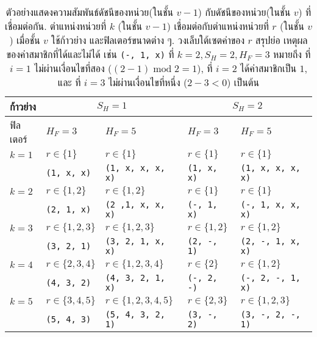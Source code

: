 %
\begin{table}[hbtp]
	\caption[ความสัมพันธ์ของดัชนีหน่วยคำนวณ]{ตัวอย่างแสดงความสัมพันธ์ดัชนีของหน่วย(ในชั้น $v-1$) กับดัชนีของหน่วย(ในชั้น $v$) ที่เชื่อมต่อกัน. 
		ตำแหน่งหน่วยที่ $k$ (ในชั้น $v-1$) เชื่อมต่อกับตำแหน่งหน่วยที่ $r$ (ในชั้น $v$) เมื่อชั้น $v$ ใช้ก้าวย่าง และฟิลเตอร์ขนาดต่าง ๆ.
		วงเล็บใต้เซตค่าของ $r$ สรุปย่อ เหตุผลของค่าสมาชิกที่ได้และไม่ได้ 
		เช่น \texttt{(-, 1, x)} ที่ $k = 2, S_H = 2, H_F = 3$ หมายถึง ที่ $i=1$ ไม่ผ่านเงื่อนไขที่สอง ($(2 - 1) \;\mathrm{mod}\; 2 = 1$), ที่ $i=2$ ได้ค่าสมาชิกเป็น $1$, และ ที่ $i=3$ ไม่ผ่านเงื่อนไขที่หนึ่ง ($2 - 3 < 0$)   เป็นต้น}
	\begin{center}
		\begin{tabular}{|l|l|l|l|l|}
			\hline 
			ก้าวย่าง & \multicolumn{2}{|c|}{$S_H = 1$} & \multicolumn{2}{|c|}{$S_H = 2$} \\
			\hline
			ฟิลเตอร์ & $H_F = 3$ & $H_F = 5$ & $H_F = 3$ & $H_F = 5$ \\
			\hline
			$k=1$ & $r \in \{1\}$       & $r \in \{1\}$       & $r \in \{1\}$       & $r \in \{1\}$       \\
			& \texttt{(1, x, x)}& \texttt{(1, x, x, x, x)}& \texttt{(1, x, x)}& \texttt{(1, x, x, x, x)} \\ 
			\hline
			$k=2$ & $r \in \{1, 2\}$       & $r \in \{1, 2\}$       
			& $r \in \{1\}$       & $r \in \{1\}$       \\
			& \texttt{(2, 1, x)}
			& \texttt{(2 ,1, x, x, x)}
			& \texttt{(-, 1, x)}
			& \texttt{(-, 1, x, x, x)} \\ 
			\hline
			$k=3$ & $r \in \{1, 2, 3\}$       & $r \in \{1, 2, 3\}$       
			& $r \in \{1, 2\}$       & $r \in \{1, 2\}$       \\
			& \texttt{(3, 2, 1)}
			& \texttt{(3, 2, 1, x, x)}
			& \texttt{(2, -, 1)}
			& \texttt{(2, -, 1, x, x)} \\ 
			\hline
			$k=4$ & $r \in \{2, 3, 4\}$       & $r \in \{1, 2, 3, 4\}$       
			& $r \in \{2\}$       & $r \in \{1, 2\}$       \\
			& \texttt{(4, 3, 2)}
			& \texttt{(4, 3, 2, 1, x)}
			& \texttt{(-, 2, -)}
			& \texttt{(-, 2, -, 1, x)} \\ 
			\hline
			$k=5$ & $r \in \{3, 4, 5\}$       & $r \in \{1, 2, 3, 4, 5\}$       
			& $r \in \{2, 3\}$       & $r \in \{1, 2, 3\}$       \\
			& \texttt{(5, 4, 3)}
			& \texttt{(5, 4, 3, 2, 1)}
			& \texttt{(3, -, 2)}& \texttt{(3, -, 2, -, 1)} \\ 
			\hline
			
		\end{tabular} 
	\end{center}
	\label{tbl: deep conv grad back}
\end{table}

